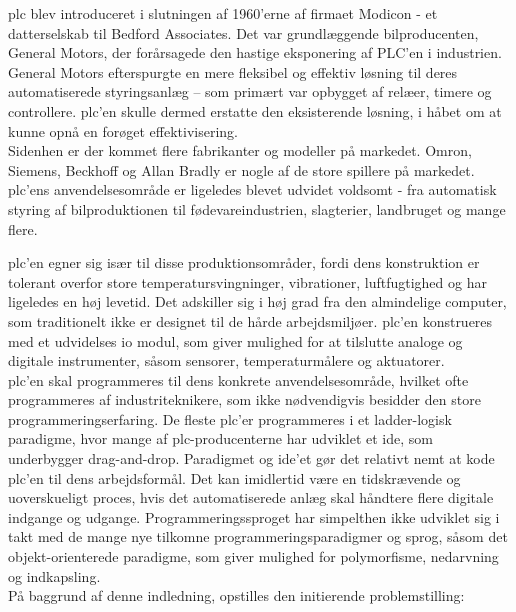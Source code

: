 \gls{plc} blev introduceret i slutningen af 1960'erne af firmaet Modicon - et datterselskab til Bedford Associates. Det var grundlæggende bilproducenten, General Motors, der forårsagede den hastige eksponering af PLC’en i industrien. General Motors efterspurgte en mere fleksibel og effektiv løsning til deres automatiserede styringsanlæg – som primært var opbygget af relæer, timere og controllere. \gls{plc}'en skulle dermed erstatte den eksisterende løsning, i håbet om at kunne opnå en forøget effektivisering. \\

\noindent Sidenhen er der kommet flere fabrikanter og modeller på markedet. Omron, Siemens, Beckhoff og Allan Bradly er nogle af de store spillere på markedet. \gls{plc}'ens anvendelsesområde er ligeledes blevet udvidet voldsomt - fra automatisk styring af bilproduktionen til fødevareindustrien, slagterier, landbruget og mange flere. 

\noindent \gls{plc}'en egner sig især til disse produktionsområder, fordi dens konstruktion er tolerant overfor store temperatursvingninger, vibrationer, luftfugtighed og har ligeledes en høj levetid. Det adskiller sig i høj grad fra den almindelige computer, som traditionelt ikke er designet til de hårde arbejdsmiljøer. \gls{plc}'en konstrueres med et udvidelses \gls{io} modul, som giver mulighed for at tilslutte analoge og digitale instrumenter, såsom sensorer, temperaturmålere og aktuatorer. \\

\noindent \gls{plc}'en skal programmeres til dens konkrete anvendelsesområde, hvilket ofte programmeres af industriteknikere, som ikke nødvendigvis besidder den store programmeringserfaring. De fleste \gls{plc}'er programmeres i et ladder-logisk paradigme, hvor mange af \gls{plc}-producenterne har udviklet et \gls{ide}, som underbygger drag-and-drop. Paradigmet og \gls{ide}'et gør det relativt nemt at kode \gls{plc}'en til dens arbejdsformål. Det kan imidlertid være en tidskrævende og uoverskueligt proces, hvis det automatiserede anlæg skal håndtere flere digitale indgange og udgange. Programmeringssproget har simpelthen ikke udviklet sig i takt med de mange nye tilkomne programmeringsparadigmer og sprog, såsom det objekt-orienterede paradigme, som giver mulighed for polymorfisme, nedarvning og indkapsling. \\

\noindent På baggrund af denne indledning, opstilles den initierende problemstilling: \\

